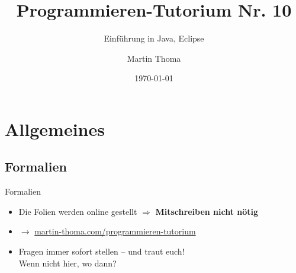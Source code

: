 \documentclass[usepdftitle=false,hyperref={pdfpagelabels=false}]{beamer}
\institute{Fakultät für Informatik}
\newcommand\tutor{Martin Thoma}
\newcommand\tutNR{10}
\newcommand\titleText{Programmieren-Tutorium Nr. \tutNR{}}
\newcommand\InsertToC[1][]{
  \begin{frame}{Outline}
    \tableofcontents[subsectionstyle=show/show/show, subsubsectionstyle=show/show/show, #1]
  \end{frame}
}
\begin{document}
\title{\titleText}
\subtitle{Einführung in Java, Eclipse}
\author{\tutor}
\date{\today}
\subject{Programmieren}

\frame{\titlepage}



\section{Allgemeines}
\subsection{Formalien}
\begin{frame}{Formalien}
    \begin{itemize}
        \item Die Folien werden online gestellt $ \Rightarrow $ 
              \textbf{Mitschreiben nicht nötig}
        \item $\rightarrow$ \href{http://martin-thoma.com/programmieren-tutorium}{martin-thoma.com/programmieren-tutorium}
        \item Fragen immer sofort stellen – und traut euch!\\ 
              Wenn nicht hier, wo dann?
    \end{itemize}
\end{frame}
\end{document}
